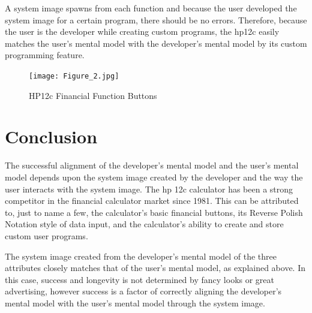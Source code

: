 \documentclass{article}
\begin{document}
A system image spawns from each function and because the user developed the system image for a certain program, there should be no errors. Therefore, because the user is the developer while creating custom programs, the hp12c easily matches the user's mental model with the developer's mental model by its custom programming feature.

\begin{figure}
\centering
\texttt{[image: Figure\_2.jpg]}
\caption{HP12c Financial Function Buttons}
\label{HP12c Program Mode}
\end{figure}


\section{Conclusion}

The successful alignment of the developer's mental model and the user's mental model depends upon the system image created by the developer and the way the user interacts with the system image. The hp 12c calculator has been a strong competitor in the financial calculator market since 1981. This can be attributed to, just to name a few, the calculator's basic financial buttons, its Reverse Polish Notation style of data input, and the calculator's ability to create and store custom user programs.

 The system image created from the developer's mental model of the three attributes closely matches that of the user's mental model, as explained above. In this case, success and longevity is not determined by fancy looks or great advertising, however success is a factor of correctly aligning the developer's mental model with the user's mental model through the system image.



\end{document}
